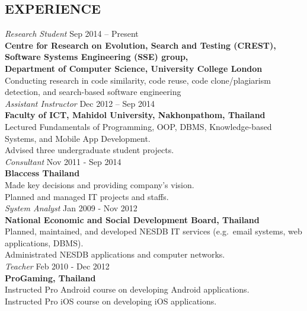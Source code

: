 \documentclass[margin, 10pt]{res} %
\begin{document}
\begin{resume}
\section{EXPERIENCE}

{\sl Research Student} \hfill Sep 2014 -- Present \\
\textbf{Centre for Research on Evolution, Search and Testing (CREST), \\ Software Systems Engineering (SSE) group, \\ Department of Computer Science, University College London}\\
Conducting research in code similarity, code reuse, code clone/plagiarism detection, and search-based software engineering \vspace{4mm} \\
{\sl Assistant Instructor} \hfill Dec 2012 -- Sep 2014 \\
\textbf{Faculty of ICT, Mahidol University, Nakhonpathom, Thailand} \\
Lectured Fundamentals of Programming, OOP, DBMS, Knowledge-based Systems, and Mobile App Development. \\
Advised three undergraduate student projects. \vspace{3mm} \\
{\sl Consultant} \hfill Nov 2011 - Sep 2014 \\
\textbf{Blaccess Thailand} \\
Made key decisions and providing company's vision. \\
Planned and managed IT projects and staffs. \vspace{3mm} \\
{\sl System Analyst} \hfill Jan 2009 - Nov 2012\\
\textbf{National Economic and Social Development Board, Thailand}\\
Planned, maintained, and developed NESDB IT services (e.g.~email systems, web applications, DBMS).\\
Administrated NESDB applications and computer networks. \vspace{3mm} \\
{\sl Teacher} \hfill Feb 2010 - Dec 2012 \\
\textbf{ProGaming, Thailand}\\
Instructed Pro Android course on developing Android applications.\\
Instructed Pro iOS course on developing iOS applications. \vspace{3mm} \\

\end{resume}
\end{document}
